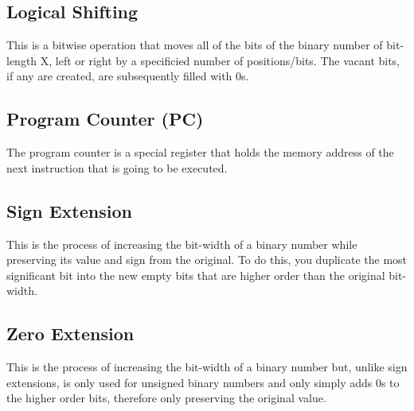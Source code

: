 \documentclass{article}
\begin{document}
\subsection{Logical Shifting}
\qquad
This is a bitwise operation that moves all of the bits of the binary number of bit-length X, left or right by a specificied number of positions/bits. The vacant bits, if any are created, are subsequently filled with 0s.

\subsection{Program Counter (PC)}
\qquad
The program counter is a special register that holds the memory address of the next instruction that is going to be executed.

\subsection{Sign Extension}
\qquad
This is the process of increasing the bit-width of a binary number while preserving its value and sign from the original. To do this, you duplicate the most significant bit into the new empty bits that are higher order than the original bit-width.

\subsection{Zero Extension}
\qquad
This is the process of increasing the bit-width of a binary number but, unlike sign extensions, is only used for unsigned binary numbers and only simply adds 0s to the higher order bits, therefore only preserving the original value.
\end{document}
